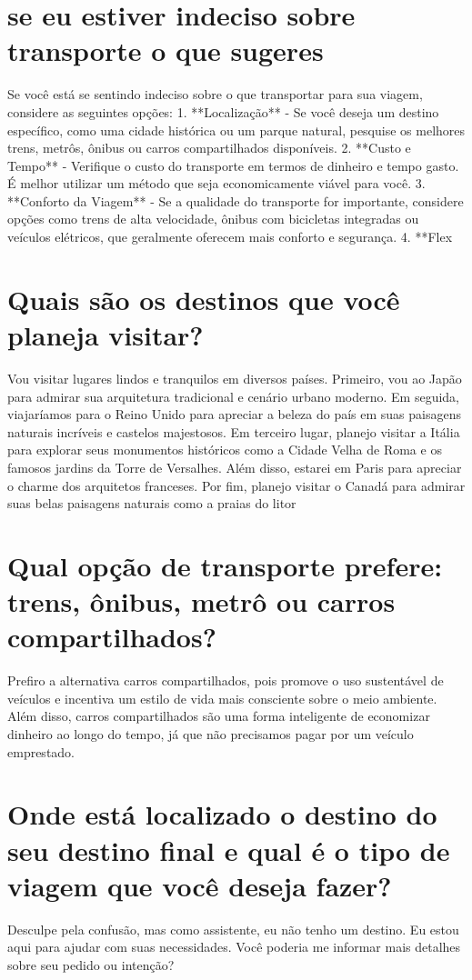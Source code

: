 \documentclass[11pt,a4paper]{article}
\begin{document}
\section{se eu estiver indeciso sobre transporte o que sugeres}
Se você está se sentindo indeciso sobre o que transportar para sua viagem, considere as seguintes opções: 1. **Localização** - Se você deseja um destino específico, como uma cidade histórica ou um parque natural, pesquise os melhores trens, metrôs, ônibus ou carros compartilhados disponíveis. 2. **Custo e Tempo** - Verifique o custo do transporte em termos de dinheiro e tempo gasto. É melhor utilizar um método que seja economicamente viável para você. 3. **Conforto da Viagem** - Se a qualidade do transporte for importante, considere opções como trens de alta velocidade, ônibus com bicicletas integradas ou veículos elétricos, que geralmente oferecem mais conforto e segurança. 4. **Flex

\section{Quais são os destinos que você planeja visitar?}
Vou visitar lugares lindos e tranquilos em diversos países. Primeiro, vou ao Japão para admirar sua arquitetura tradicional e cenário urbano moderno. Em seguida, viajaríamos para o Reino Unido para apreciar a beleza do país em suas paisagens naturais incríveis e castelos majestosos. Em terceiro lugar, planejo visitar a Itália para explorar seus monumentos históricos como a Cidade Velha de Roma e os famosos jardins da Torre de Versalhes. Além disso, estarei em Paris para apreciar o charme dos arquitetos franceses. Por fim, planejo visitar o Canadá para admirar suas belas paisagens naturais como a praias do litor

\section{Qual opção de transporte prefere: trens, ônibus, metrô ou carros compartilhados?}
Prefiro a alternativa carros compartilhados, pois promove o uso sustentável de veículos e incentiva um estilo de vida mais consciente sobre o meio ambiente. Além disso, carros compartilhados são uma forma inteligente de economizar dinheiro ao longo do tempo, já que não precisamos pagar por um veículo emprestado.

\section{Onde está localizado o destino do seu destino final e qual é o tipo de viagem que você deseja fazer?}
Desculpe pela confusão, mas como assistente, eu não tenho um destino. Eu estou aqui para ajudar com suas necessidades. Você poderia me informar mais detalhes sobre seu pedido ou intenção?
\end{document}
